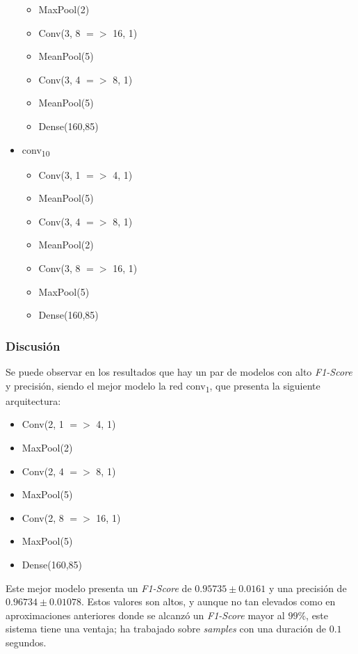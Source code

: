 \documentclass[12pt]{article}
\begin{document}
\begin{itemize}
\begin{itemize}
  		\item MaxPool(2)
		\item Conv(3, 8 $=>$ 16, 1)
    	\item MeanPool(5)
		\item Conv(3, 4 $=>$ 8, 1)
		\item MeanPool(5)
  		\item Dense(160,85)
	\end{itemize}
	\item conv\textsubscript{10} \begin{itemize}
		\item Conv(3, 1 $=>$ 4, 1)
  		\item MeanPool(5)
		\item Conv(3, 4 $=>$ 8, 1)
    	\item MeanPool(2)
		\item Conv(3, 8 $=>$ 16, 1)
		\item MaxPool(5)
  		\item Dense(160,85)
	\end{itemize}
\end{itemize}

\subsubsection{Discusión}

Se puede observar en los resultados que hay un par de modelos con alto \textit{F1-Score} y precisión,
siendo el mejor modelo la red conv\textsubscript{1}, que presenta la siguiente arquitectura:

\begin{itemize}
	\item Conv(2, 1 $=>$ 4, 1)
	\item MaxPool(2)
	\item Conv(2, 4 $=>$ 8, 1)
	\item MaxPool(5)
	\item Conv(2, 8 $=>$ 16, 1)
	\item MaxPool(5)
	\item Dense(160,85)
\end{itemize}

Este mejor modelo presenta un \textit{F1-Score} de $0.95735 \pm 0.0161$ y una
precisión de  $0.96734 \pm 0.01078$. Estos valores son altos, y aunque no tan elevados como en aproximaciones
anteriores donde se alcanzó un \textit{F1-Score} mayor al $99\%$, este sistema tiene una ventaja; ha trabajado 
sobre \textit{samples} con una duración de $0.1$ segundos.
\end{document}

